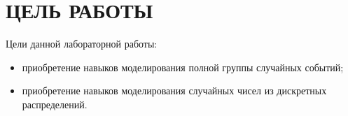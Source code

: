 \section{ЦЕЛЬ РАБОТЫ}

Цели данной лабораторной работы:

\begin{itemize}
\item
  приобретение навыков моделирования полной группы случайных событий;
\item
  приобретение навыков моделирования случайных чисел из дискретных распределений.

\end{itemize}
